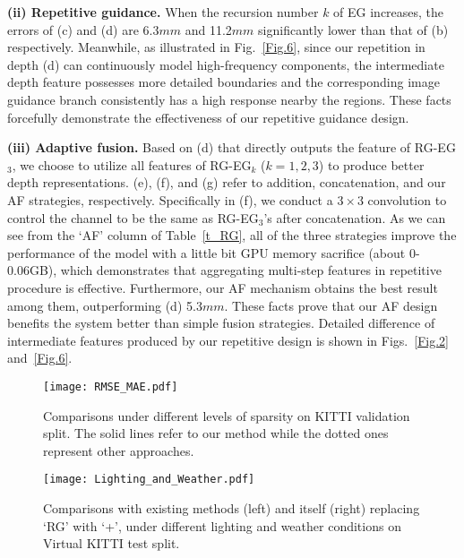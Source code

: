 \documentclass[runningheads]{llncs}
\begin{document}
\textbf{(ii) Repetitive guidance.} When the recursion number $k$ of EG increases, the errors of (c) and (d) are 6.3$mm$ and 11.2$mm$ significantly lower than that of (b) respectively. Meanwhile, as illustrated in Fig.~\ref{Fig.6}, since our repetition in depth (d) can continuously model high-frequency components, the intermediate depth feature possesses more detailed boundaries and the corresponding image guidance branch consistently has a high response nearby the regions. These facts forcefully demonstrate the effectiveness of our repetitive guidance design.


\textbf{(iii) Adaptive fusion.} Based on (d) that directly outputs the feature of RG-EG$_3$, we choose to utilize all features of RG-EG$_k$ ($k=1,2,3$) to produce better depth representations. (e), (f), and (g) refer to addition, concatenation, and our AF strategies, respectively. Specifically in (f), we conduct a $3 \times 3$ convolution to control the channel to be the same as RG-EG$_3$'s after concatenation. As we can see from the `AF' column of Table~\ref{t_RG}, all of the three strategies improve the performance of the model with a little bit GPU memory sacrifice (about 0-0.06GB), which demonstrates that aggregating multi-step features in repetitive procedure is effective. Furthermore, our AF mechanism obtains the best result among them, outperforming (d) 5.3$mm$. These facts prove that our AF design benefits the system better than simple fusion strategies. Detailed difference of intermediate features produced by our repetitive design is shown in Figs.~\ref{Fig.2} and~\ref{Fig.6}.


\begin{figure*}[t]
  \centering
  \texttt{[image: RMSE\_MAE.pdf]}\\
  \caption{Comparisons under different levels of sparsity on KITTI validation split. The solid lines refer to our method while the dotted ones represent other approaches.}\label{density_kitti}
\end{figure*}


\begin{figure*}[t]
  \centering
  \texttt{[image: Lighting\_and\_Weather.pdf]}\\
  \caption{Comparisons with existing methods (left) and itself (right) replacing `RG' with `+', under different lighting and weather conditions on Virtual KITTI test split.}\label{Lighting_and_Weather}
\end{figure*}
\end{document}

